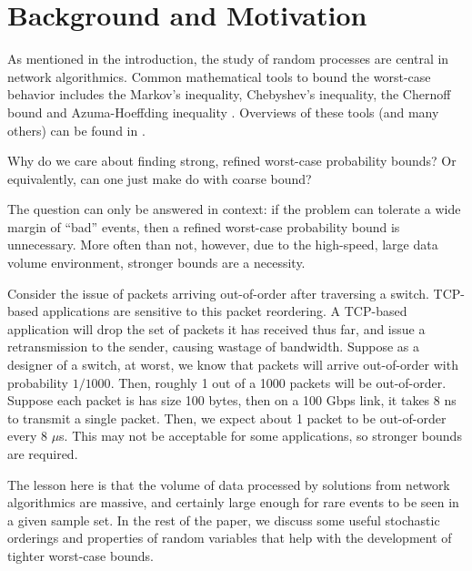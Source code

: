 \section{Background and Motivation}

As mentioned in the introduction, the study of random processes are central in network algorithmics. 
Common mathematical tools to bound the worst-case behavior includes the Markov's inequality,
Chebyshev's inequality, the Chernoff bound and 
Azuma-Hoeffding inequality \cite{Azuma67Martingale,Hoeffding63Bounded}. Overviews of these
tools (and many others) can be found in \cite{Alon04ProbMethod,MitzenmacherProb05,Raghavan95RandAlgo}.

Why do we care about finding strong, refined worst-case probability bounds? Or equivalently, can one just
make do with coarse bound?

The question can only be answered in context: if the problem can tolerate a wide margin of
``bad'' events, then a refined worst-case probability bound is unnecessary. More often than not, however,
due to the high-speed, large data volume environment, stronger bounds are a necessity.

Consider the issue of packets arriving out-of-order after traversing a switch. TCP-based applications
are sensitive to this packet reordering. A TCP-based application will drop the set of packets it has received thus far, and
issue a retransmission to the sender, causing wastage of bandwidth. Suppose as a designer of a switch, at 
worst, we know that packets will arrive out-of-order with probability $1/1000$. Then, roughly 1 out of a 
1000 packets will be out-of-order. Suppose each packet is has size 100 bytes, then on a 100 Gbps link,
it takes 8 ns to transmit a single packet. Then, we expect about 1 packet to be out-of-order every 8 
$\mu$s. This may not be acceptable for some applications, so stronger bounds are required.

The lesson here is that the volume of data processed by solutions from network algorithmics are massive,
and certainly large enough for rare events to be seen in a given sample set. In the rest of the paper, we
discuss some useful stochastic orderings and properties of random variables that help with the development
of tighter worst-case bounds. 

